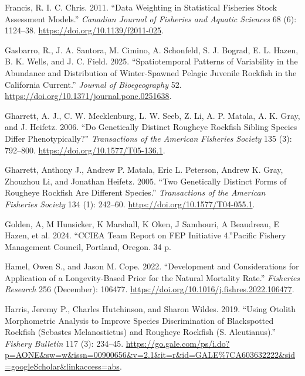 \documentclass[
]{scrartcl}
\newlength{\cslhangindent}
\newenvironment{CSLReferences}[2] %
 {\begin{list}{}{%
  \setlength{\itemindent}{0pt}
  \setlength{\leftmargin}{0pt}
  \setlength{\parsep}{0pt}
  \ifodd #1
   \setlength{\leftmargin}{\cslhangindent}
   \setlength{\itemindent}{-1\cslhangindent}
  \fi
  \setlength{\itemsep}{#2\baselineskip}}}
 {\end{list}}
\begin{document}
\begin{CSLReferences}{1}{0}
Francis, R. I. C. Chris. 2011. {``Data Weighting in Statistical
Fisheries Stock Assessment Models.''} \emph{Canadian Journal of
Fisheries and Aquatic Sciences} 68 (6): 1124--38.
\url{https://doi.org/10.1139/f2011-025}.

Gasbarro, R., J. A. Santora, M. Cimino, A. Schonfeld, S. J. Bograd, E.
L. Hazen, B. K. Wells, and J. C. Field. 2025. {``Spatiotemporal Patterns
of Variability in the Abundance and Distribution of Winter-Spawned
Pelagic Juvenile Rockfish in the {C}alifornia {C}urrent.''}
\emph{Journal of Bioegeography} 52.
\url{https://doi.org/10.1371/journal.pone.0251638}.

Gharrett, A. J., C. W. Mecklenburg, L. W. Seeb, Z. Li, A. P. Matala, A.
K. Gray, and J. Heifetz. 2006. {``Do {Genetically} {Distinct} {Rougheye}
{Rockfish} {Sibling} {Species} {Differ} {Phenotypically}?''}
\emph{Transactions of the American Fisheries Society} 135 (3): 792--800.
\url{https://doi.org/10.1577/T05-136.1}.

Gharrett, Anthony J., Andrew P. Matala, Eric L. Peterson, Andrew K.
Gray, Zhouzhou Li, and Jonathan Heifetz. 2005. {``Two {Genetically}
{Distinct} {Forms} of {Rougheye} {Rockfish} {Are} {Different}
{Species}.''} \emph{Transactions of the American Fisheries Society} 134
(1): 242--60. \url{https://doi.org/10.1577/T04-055.1}.

Golden, A, M Hunsicker, K Marshall, K Oken, J Samhouri, A Beaudreau, E
Hazen, et al. 2024. {``{CCIEA Team Report on FEP Initiative
4}.''}{Pacific Fishery Management Council, Portland, Oregon. 34 p.}

Hamel, Owen S., and Jason M. Cope. 2022. {``Development and
Considerations for Application of a Longevity-Based Prior for the
Natural Mortality Rate.''} \emph{Fisheries Research} 256 (December):
106477. \url{https://doi.org/10.1016/j.fishres.2022.106477}.

Harris, Jeremy P., Charles Hutchinson, and Sharon Wildes. 2019. {``Using
Otolith Morphometric Analysis to Improve Species Discrimination of
Blackspotted Rockfish ({Sebastes} Melanostictus) and Rougheye Rockfish
({S}. Aleutianus).''} \emph{Fishery Bulletin} 117 (3): 234--45.
\url{https://go.gale.com/ps/i.do?p=AONE&sw=w&issn=00900656&v=2.1&it=r&id=GALE\%7CA603632222&sid=googleScholar&linkaccess=abs}.


\end{CSLReferences}
\end{document}
